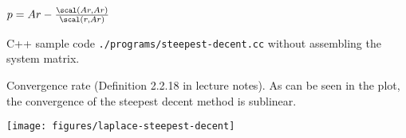 \begin{SolutionSheet}[\ref{sheet8}]
\begin{onehalfspace}
  \begin{Solution}
    $p = Ar - \frac{\scal(Ar,Ar)}{\scal(r,Ar)}$
  \end{Solution}

  \begin{Solution}[Programming]
    C++ sample code \lstinline{./programs/steepest-decent.cc} without
    assembling the system matrix.

    Convergence rate (Definition 2.2.18 in lecture notes).  As can be
    seen in the plot, the convergence of the steepest decent method is
    sublinear.

    \texttt{[image: figures/laplace-steepest-decent]}
  \end{Solution}
\end{onehalfspace}
\end{SolutionSheet}


